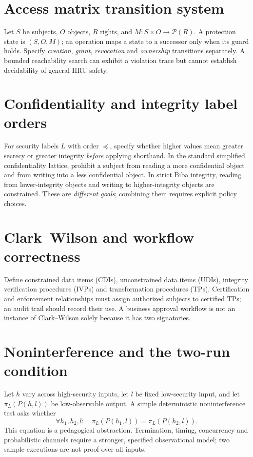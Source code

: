 \documentclass[10pt,letterpaper]{article}
\begin{document}
\section{Access matrix transition system}
Let $S$ be subjects, $O$ objects, $R$ rights, and $M:S\times O\rightarrow\mathcal{P}(R)$. A protection state is $(S,O,M)$; an operation maps a state to a successor only when its guard holds. Specify \emph{creation}, \emph{grant}, \emph{revocation} and \emph{ownership} transitions separately. A bounded reachability search can exhibit a violation trace but cannot establish decidability of general HRU safety.
\section{Confidentiality and integrity label orders}
For security labels $L$ with order $\preceq$, specify whether higher values mean greater secrecy or greater integrity \emph{before} applying shorthand. In the standard simplified confidentiality lattice, prohibit a subject from reading a more confidential object and from writing into a less confidential object. In strict Biba integrity, reading from lower-integrity objects and writing to higher-integrity objects are constrained. These are \emph{different goals}; combining them requires explicit policy choices.
\section{Clark--Wilson and workflow correctness}
Define constrained data items (CDIs), unconstrained data items (UDIs), integrity verification procedures (IVPs) and transformation procedures (TPs). Certification and enforcement relationships must assign authorized subjects to certified TPs; an audit trail should record their use. A business approval workflow is not an instance of Clark--Wilson solely because it has two signatories.
\section{Noninterference and the two-run condition}
Let $h$ vary across high-security inputs, let $l$ be fixed low-security input, and let $\pi_L(P(h,l))$ be low-observable output. A simple deterministic noninterference test asks whether
\[
 \forall h_1,h_2,l:\quad \pi_L(P(h_1,l))=\pi_L(P(h_2,l)).
\]
This equation is a pedagogical abstraction. Termination, timing, concurrency and probabilistic channels require a stronger, specified observational model; two sample executions are not proof over all inputs.
\end{document}
